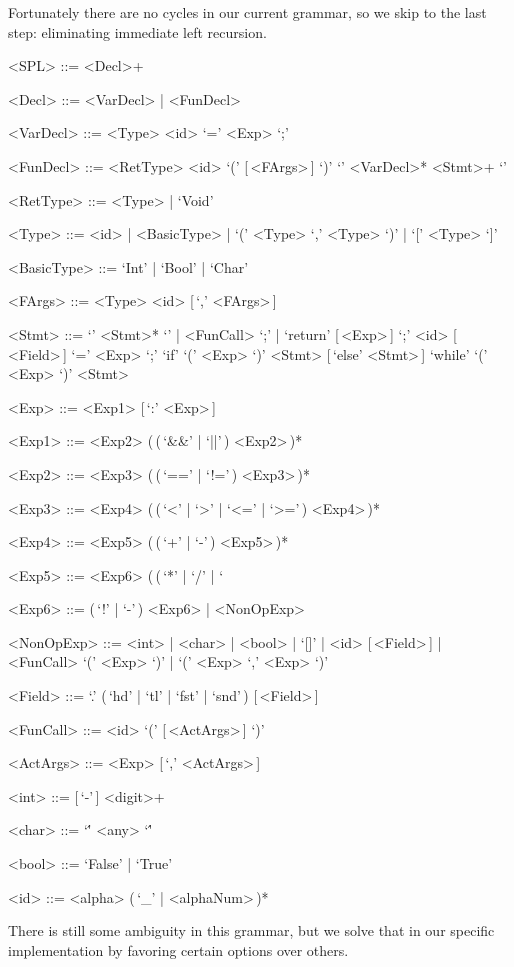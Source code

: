 \documentclass{article}
\begin{document}
Fortunately there are no cycles in our current grammar, so we skip to the last step: eliminating immediate left recursion.
\begin{grammar}
    <SPL> ::= <Decl>+

    <Decl> ::= <VarDecl> | <FunDecl>

    <VarDecl> ::= <Type> <id> `=' <Exp> `;'

    <FunDecl> ::= <RetType> <id> `(' [\,<FArgs>\,] `)' `{' <VarDecl>* <Stmt>+ `}'

    <RetType> ::= <Type> | `Void'

    <Type> ::= <id> | <BasicType> | `(' <Type> `,' <Type> `)' | `[' <Type> `]'

    <BasicType> ::= `Int' | `Bool' | `Char'

    <FArgs> ::= <Type> <id> [\,`,' <FArgs>\,]

    <Stmt> ::= `{' <Stmt>* `}' | <FunCall> `;' | `return' [\,<Exp>\,] `;'
    \alt <id> [\,<Field>\,] `=' <Exp> `;'
    \alt `if' `(' <Exp> `)' <Stmt> [\,`else' <Stmt>\,]
    \alt `while' `(' <Exp> `)' <Stmt>

    <Exp> ::= <Exp1> [\,`:' <Exp>\,]

    <Exp1> ::= <Exp2> (\,(\,`&&' | `||'\,) <Exp2>\,)*

    <Exp2> ::= <Exp3> (\,(\,`==' | `!='\,) <Exp3>\,)*

    <Exp3> ::= <Exp4> (\,(\,`<' | `>' | `<=' | `>='\,) <Exp4>\,)*

    <Exp4> ::= <Exp5> (\,(\,`+' | `-'\,) <Exp5>\,)*

    <Exp5> ::= <Exp6> (\,(\,`*' | `/' | `%

    <Exp6> ::= (\,`!' | `-'\,) <Exp6> | <NonOpExp>

    <NonOpExp> ::= <int> | <char> | <bool> | `[]' | <id> [\,<Field>\,] | <FunCall>
    \alt `(' <Exp> `)' | `(' <Exp> `,' <Exp> `)'

    <Field> ::= `.' (\,`hd' | `tl' | `fst' | `snd'\,) [\,<Field>\,]

    <FunCall> ::= <id> `(' [\,<ActArgs>\,] `)'

    <ActArgs> ::= <Exp> [\,`,' <ActArgs>\,]

    <int> ::= [\,`-'\,] <digit>+

    <char> ::= `\'' <any> `\''

    <bool> ::= `False' | `True'

    <id> ::= <alpha> (\,`_' | <alphaNum>\,)*
\end{grammar}
There is still some ambiguity in this grammar, but we solve that in our specific implementation by favoring certain options over others.
\end{document}

